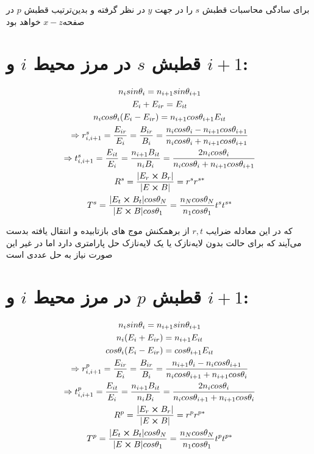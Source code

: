 \documentclass{article}
\begin{document}
	برای سادگی محاسبات قطبش $s$ را در جهت $y$ در نظر گرفته و بدین‌ترتیب قطبش $p$ در صفحه$x-z$ خواهد بود
	
	
	
	
	\section*{قطبش $s$ در مرز محیط $i$ و $i+1$:}
	
	\begin{gather*}
		n_i sin \theta_i= n _{i+1} sin \theta_{i+1}\\
		E_i+E_{ir}=E_{it}\\
		n_i cos \theta_i(	E_i-E_{ir})=n_{i+1}cos \theta_{i+1} E_{it}\\
		\Rightarrow r^s_{i,i+1}=\frac{E_{ir}}{E_i}=\frac{B_{ir}}{B_i}=\frac{n_i cos \theta_i-n_{i+1}cos \theta_{i+1}}{n_i cos \theta_i+n_{i+1}cos \theta_{i+1}}\\
		\Rightarrow t^s_{i,i+1}=\frac{E_{it}}{E_i}=\frac{n_{i+1} B_{it}}{n_i B_i}=\frac{2n_i cos \theta_i}{n_i cos \theta_i+n_{i+1}cos \theta_{i+1}}\\
		R^s=\frac{|E_{r}\cross B_{r}|}{|E\cross B|}=r^s r^{s*}\\
		T^s=\frac{|E_{t}\cross B_{t}|cos \theta_{N}}{|E\cross B|cos \theta_1}=\frac{n_Ncos \theta_N}{n_1cos \theta_1} t^s t^{s*}
	\end{gather*}
	
	که در این معادله ضرایب $r,t$  از برهمکنش موج های بازتابیده و انتقال یافته بدست می‌آیند که برای حالت بدون لایه‌نازک یا یک لایه‌نازک حل پارامتری دارد اما در غیر این صورت نیاز به حل عددی است
	
	\newpage
	\section*{قطبش $p$ در مرز محیط $i$ و $i+1$:} 
	
	\begin{gather*}
		n_i sin \theta_i= n _{i+1} sin \theta_{i+1}\\
		n_i(E_i+E_{ir})=n_{i+1}E_{it}\\
		cos \theta_i(	E_i-E_{ir})=cos \theta_{i+1} E_{it}\\
		\Rightarrow r^p_{i,i+1}=\frac{E_{ir}}{E_i}=\frac{B_{ir}}{B_i}=\frac{n_{i+1}\theta_i-n_i cos \theta_{i+1}}{n_i cos \theta_{i+1}+n_{i+1}cos \theta_i}\\
		\Rightarrow t^p_{i,i+1}=\frac{E_{it}}{E_i}=\frac{n_{i+1} B_{it}}{n_i B_i}=\frac{2n_i cos \theta_i}{n_i cos \theta_{i+1}+n_{i+1}cos \theta_i}\\
		R^p=\frac{|E_{r}\cross B_{r}|}{|E\cross B|}=r^p r^{p*}\\
		T^p=\frac{|E_{t}\cross B_{t}|cos \theta_{N}}{|E\cross B|cos \theta_1}=\frac{n_Ncos \theta_N}{n_1cos \theta_1} t^p t^{p*}
	\end{gather*}
	
\end{document}

